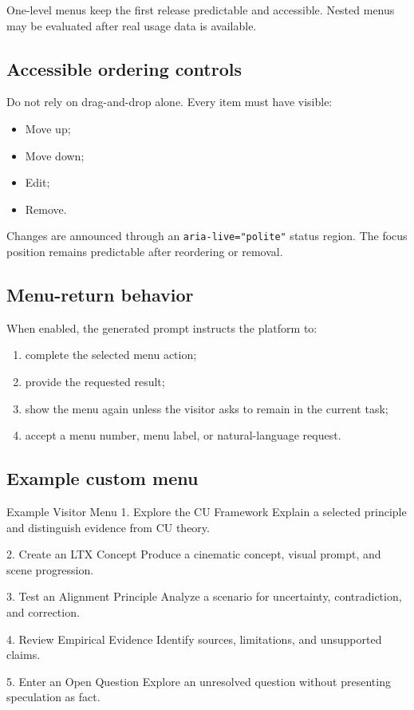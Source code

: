 \documentclass[11pt,letterpaper]{article}
\begin{document}
One-level menus keep the first release predictable and accessible. Nested menus
may be evaluated after real usage data is available.

\subsection{Accessible ordering controls}

Do not rely on drag-and-drop alone. Every item must have visible:

\begin{itemize}
    \item Move up;
    \item Move down;
    \item Edit;
    \item Remove.
\end{itemize}

Changes are announced through an \texttt{aria-live="polite"} status region. The
focus position remains predictable after reordering or removal.

\subsection{Menu-return behavior}

When enabled, the generated prompt instructs the platform to:

\begin{enumerate}
    \item complete the selected menu action;
    \item provide the requested result;
    \item show the menu again unless the visitor asks to remain in the current task;
    \item accept a menu number, menu label, or natural-language request.
\end{enumerate}

\subsection{Example custom menu}

\begin{codebox}{Example Visitor Menu}
1. Explore the CU Framework
   Explain a selected principle and distinguish evidence from CU theory.

2. Create an LTX Concept
   Produce a cinematic concept, visual prompt, and scene progression.

3. Test an Alignment Principle
   Analyze a scenario for uncertainty, contradiction, and correction.

4. Review Empirical Evidence
   Identify sources, limitations, and unsupported claims.

5. Enter an Open Question
   Explore an unresolved question without presenting speculation as fact.
\end{codebox}
\end{document}
